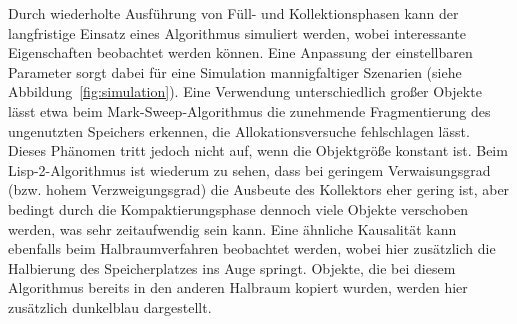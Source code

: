Durch wiederholte Ausführung von Füll- und Kollektionsphasen kann der langfristige Einsatz eines Algorithmus simuliert werden, wobei interessante Eigenschaften beobachtet werden können.
Eine Anpassung der einstellbaren Parameter sorgt dabei für eine Simulation mannigfaltiger Szenarien (siehe Abbildung~\ref{fig:simulation}).
Eine Verwendung unterschiedlich großer Objekte lässt etwa beim Mark-Sweep-Algorithmus die zunehmende Fragmentierung des ungenutzten Speichers erkennen, die Allokationsversuche fehlschlagen lässt.
Dieses Phänomen tritt jedoch nicht auf, wenn die Objektgröße konstant ist.
Beim Lisp-2-Algorithmus ist wiederum zu sehen, dass bei geringem Verwaisungsgrad (bzw. hohem Verzweigungsgrad) die Ausbeute des Kollektors eher gering ist, aber bedingt durch die Kompaktierungsphase dennoch viele Objekte verschoben werden, was sehr zeitaufwendig sein kann.
Eine ähnliche Kausalität kann ebenfalls beim Halbraumverfahren beobachtet werden, wobei hier zusätzlich die Halbierung des Speicherplatzes ins Auge springt.
Objekte, die bei diesem Algorithmus bereits in den anderen Halbraum kopiert wurden, werden hier zusätzlich dunkelblau dargestellt.

